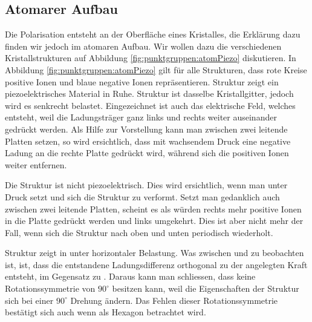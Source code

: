 \subsection{Atomarer Aufbau}
Die Polarisation entsteht an der Oberfläche eines Kristalles, die Erklärung dazu finden wir jedoch im atomaren Aufbau.
Wir wollen dazu die verschiedenen Kristallstrukturen auf Abbildung \ref{fig:punktgruppen:atomPiezo} diskutieren.
In Abbildung \ref{fig:punktgruppen:atomPiezo} gilt für alle Strukturen, dass rote Kreise positive Ionen und blaue negative Ionen repräsentieren. 
Struktur  zeigt ein piezoelektrisches Material in Ruhe. 
Struktur  ist dasselbe Kristallgitter, jedoch wird es senkrecht belastet. 
Eingezeichnet ist auch das elektrische Feld, welches entsteht, weil die Ladungsträger ganz links und rechts weiter auseinander gedrückt werden.
Als Hilfe zur Vorstellung kann man  zwischen zwei leitende Platten setzen, so wird ersichtlich, 
dass mit wachsendem Druck eine negative Ladung an die rechte Platte gedrückt wird, während sich die positiven Ionen weiter entfernen. 
\par
Die Struktur  ist nicht piezoelektrisch.
Dies wird ersichtlich, wenn man  unter Druck setzt und sich die Struktur zu  verformt.
Setzt man  gedanklich auch zwischen zwei leitende Platten, 
scheint es als würden rechts mehr positive Ionen in die Platte gedrückt werden und links umgekehrt.
Dies ist aber nicht mehr der Fall, wenn sich die Struktur nach oben und unten periodisch wiederholt.
\par
Struktur  zeigt  in unter horizontaler Belastung. 
Was zwischen  und  zu beobachten ist, 
ist, dass die entstandene Ladungsdifferenz orthogonal zu der angelegten Kraft entsteht, 
im Gegensatz zu .
Daraus kann man schliessen, dass  keine Rotationssymmetrie von \(90^\circ\) besitzen kann, 
weil die Eigenschaften der Struktur sich bei einer \(90^\circ\) Drehung ändern. 
Das Fehlen dieser Rotationssymmetrie bestätigt sich auch wenn  als Hexagon betrachtet wird. 

